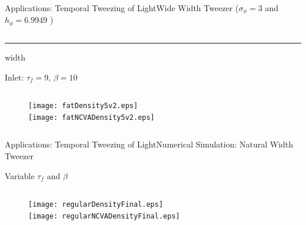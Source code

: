 \begin{frame}[c]{Applications: Temporal Tweezing of Light}{\textcolor{paleblue}{Wide Width Tweezer} ($\sigma_\phi = 3$ and $h_\phi  = 6.9949$ )}
\begin{columns}
\begin{column}{0.75\textwidth}
\hrule width\textwidth 

\vspace{0.5em}
{\small Inlet:  $\tau_f =9$, $\beta = 10$ }
\begin{columns}
\begin{column}{0.5\textwidth}
\centering
\vspace{-1em}
\begin{figure}
\hspace{2em}\texttt{[image: fatDensity5v2.eps]}  \\
\vspace{-0.5em}
\hspace{2em}\texttt{[image: fatNCVADensity5v2.eps]} 
\end{figure}
\end{column}
\begin{column}{0.5\textwidth}
\vspace{-0.5em} \raggedright
\hspace{-2em}%
\end{column}
\end{columns}
\end{column}
\end{columns}
\end{frame}

\begin{frame}{Applications: Temporal Tweezing of Light}{Numerical Simulation: \textcolor{paleblue}{Natural Width Tweezer}}
\raggedright {Variable $\tau_f$ and $\beta$}
\centering
\begin{columns}
\begin{column}{0.45\textwidth}
\centering
\vspace{-2em}
\begin{figure}
\hspace{2em}\texttt{[image: regularDensityFinal.eps]}  \\
\vspace{-1.4em}
\hspace{2em}\texttt{[image: regularNCVADensityFinal.eps]} 
\end{figure}
\end{column}
\begin{column}{0.55\textwidth}
\vspace{1.5em} \raggedright
\hspace{-2em}%
\end{column}
\end{columns}

\end{frame}

